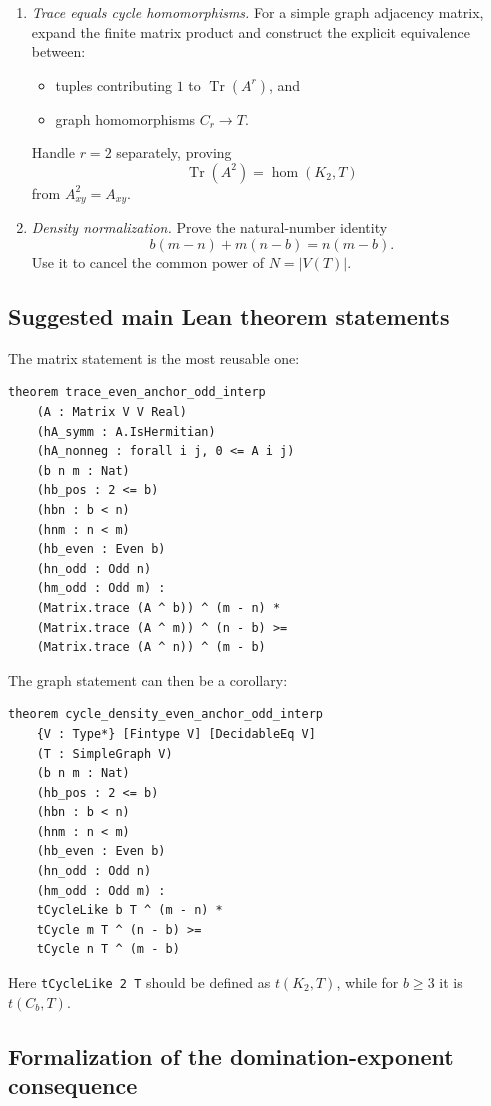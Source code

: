 \documentclass[11pt]{article}
\newcommand{\homn}{\operatorname{hom}}
\newcommand{\tr}{\operatorname{Tr}}
\newcommand{\1}{\mathbf{1}}
\begin{document}
\begin{enumerate}[label=\textbf{L\arabic*.},leftmargin=2.4em]
\item \emph{Trace equals cycle homomorphisms.}
For a simple graph adjacency matrix, expand the finite matrix product and
construct the explicit equivalence between:
\begin{itemize}
\item tuples contributing $1$ to $\tr(A^r)$, and
\item graph homomorphisms $C_r\to T$.
\end{itemize}
Handle $r=2$ separately, proving
\[
  \tr(A^2)=\homn(K_2,T)
\]
from $A_{xy}^2=A_{xy}$.

\item \emph{Density normalization.}
Prove the natural-number identity
\[
  b(m-n)+m(n-b)=n(m-b).
\]
Use it to cancel the common power of $N=|V(T)|$.
\end{enumerate}

\subsection{Suggested main Lean theorem statements}

The matrix statement is the most reusable one:
\begin{verbatim}
theorem trace_even_anchor_odd_interp
    (A : Matrix V V Real)
    (hA_symm : A.IsHermitian)
    (hA_nonneg : forall i j, 0 <= A i j)
    (b n m : Nat)
    (hb_pos : 2 <= b)
    (hbn : b < n)
    (hnm : n < m)
    (hb_even : Even b)
    (hn_odd : Odd n)
    (hm_odd : Odd m) :
    (Matrix.trace (A ^ b)) ^ (m - n) *
    (Matrix.trace (A ^ m)) ^ (n - b) >=
    (Matrix.trace (A ^ n)) ^ (m - b)
\end{verbatim}

The graph statement can then be a corollary:
\begin{verbatim}
theorem cycle_density_even_anchor_odd_interp
    {V : Type*} [Fintype V] [DecidableEq V]
    (T : SimpleGraph V)
    (b n m : Nat)
    (hb_pos : 2 <= b)
    (hbn : b < n)
    (hnm : n < m)
    (hb_even : Even b)
    (hn_odd : Odd n)
    (hm_odd : Odd m) :
    tCycleLike b T ^ (m - n) *
    tCycle m T ^ (n - b) >=
    tCycle n T ^ (m - b)
\end{verbatim}
Here \texttt{tCycleLike 2 T} should be defined as $t(K_2,T)$, while for $b\ge3$ it
is $t(C_b,T)$.

\subsection{Formalization of the domination-exponent consequence}
\end{document}
